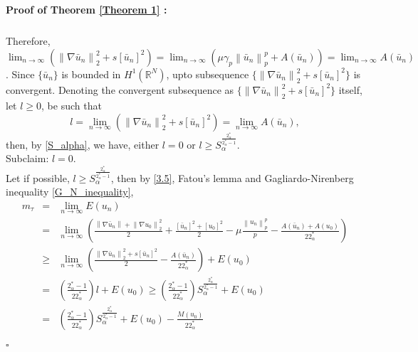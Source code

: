 \documentclass[11pt]{article}
\numberwithin{equation}{section}
\numberwithin{mytheorem}{section}
\newenvironment{myproof}[2] {\paragraph{Proof of {#1} {#2} :}}{\hfill$\square$}
\begin{document}
\begin{myproof}{Theorem}{\ref{Theorem 1}}
\begin{eqnarray*}
			\end{eqnarray*}
			Therefore, $\displaystyle \lim_{n\rightarrow \infty}\left(\left\|\nabla \bar{u}_n\right\|_2^2+s[\bar{u}_n]^2\right)=\lim_{n\rightarrow \infty}\left(\mu\gamma_p\left\| \bar{u}_n\right\|_p^p+A(\bar{u}_n)\right)=\lim_{n\rightarrow \infty}A(\bar{u}_n)$. Since $\{\bar{u}_n\}$ is bounded in $H^1(\mathbb{R}^N)$, upto subsequence $\{\left\| \nabla \bar{u}_n\right\|_2^2+s[\bar{u}_n]^2\}$ is convergent. Denoting the convergent subsequence as $\{\left\| \nabla \bar{u}_n\right\|_2^2+s[\bar{u}_n]^2\}$ itself, let $l\geq 0$, be such that
			\begin{equation}\label{3.6}
				l=\lim_{n\rightarrow \infty}\left(\left\| \nabla \bar{u}_n\right\|_2^2+s[\bar{u}_n]^2\right)=\lim_{n\rightarrow \infty}A(\bar{u}_n),
			\end{equation}
			then, by \eqref{S_alpha}, we have, either $l=0$ or $l\geq S_{\alpha}^{\frac{2^*_{\alpha}}{2^*_{\alpha}-1}}$.\\
			Subclaim: $l=0$.\\
			Let if possible, $l\geq S_{\alpha}^{\frac{2^*_{\alpha}}{2^*_{\alpha}-1}}$, then by \eqref{3.5}, Fatou's lemma and Gagliardo-Nirenberg inequality \eqref{G_N_inequality},
			\begin{eqnarray*}
				m_{\tau} & = & \lim_{n\rightarrow \infty}E(u_n)\\
				& = & \lim_{n\rightarrow \infty}\left(\frac{\left\| \nabla \bar{u}_n\right\|+\left\|\nabla u_0\right\|_2^2}{2}+\frac{[\bar{u}_n]^2+[u_0]^2}{2}-\mu \frac{\left\| u_n \right\|_p^p}{p}-\frac{A(\bar{u}_n)+A(u_0)}{22^*_{\alpha}}\right)\nonumber\\
				& \geq & \lim_{n\rightarrow \infty}\left(\frac{\left\| \nabla \bar{u}_n\right\|_2^2+s[\bar{u}_n]^2}{2}
				-\frac{A(\bar{u}_n)}{22^*_{\alpha}}\right)+E(u_0)\nonumber\\
				& = & \left(\frac{2^*_{\alpha}-1}{22^*_{\alpha}}\right)l+E(u_0)\geq \left(\frac{2^*_{\alpha}-1}{22^*_{\alpha}}\right)S_{\alpha}^{\frac{2^*_{\alpha}}{2^*_{\alpha}-1}}+E(u_0)\nonumber\\
				& = & \left(\frac{2^*_{\alpha}-1}{22^*_{\alpha}}\right)S_{\alpha}^{\frac{2^*_{\alpha}}{2^*_{\alpha}-1}}+E(u_0) -\frac{M(u_0)}{22^*_{\alpha}}\nonumber\\

\end{eqnarray*}
\end{myproof}
\end{document}
